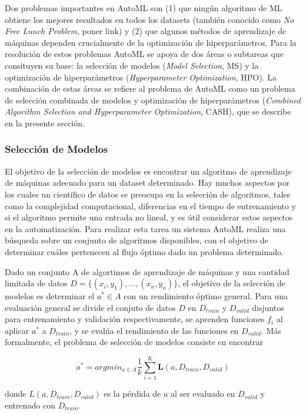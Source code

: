 Dos problemas importantes en AutoML son (1) que ningún algoritmo de ML obtiene los mejores resultados en todos los datasets (también conocido como \textit{No Free Lunch Problem}, poner link) y (2) que algunos métodos de aprendizaje de máquinas dependen crucialmente de la optimización de hiperparámetros. Para la resolución de estos problemas AutoML se apoya de dos áreas o subtareas que consituyen su base: la selección de modelos (\textit{Model Selection}, MS) y la optimización de hiperparámetros (\textit{Hyperparameter Optimization}, HPO). La combinación de estas áreas se refiere al problema de AutoML como un problema de selección combinada de modelos y optimización de hiperparámetros (\textit{Combined Algorithm Selection and Hyperparameter Optimization}, CASH), que se describe en la presente sección.

\subsubsection{Selección de Modelos}

El objetivo de la selección de modelos es encontrar un algoritmo de aprendizaje de máquinas adecuado para un dataset determinado. Hay muchos aspectos por los cuales un científico de datos se preocupa en la selección de algoritmos, tales como la complejidad computacional, diferencias en el tiempo de entrenamiento y si el algoritmo permite una entrada no lineal, y es útil considerar estos aspectos en la automatización. Para realizar esta tarea un sistema AutoML realiza una búsqueda sobre un conjunto de algoritmos disponibles, con el objetivo de determinar cuáles pertenecen al flujo óptimo dado un problema determinado.

\begin{definition}
	Dado un conjunto A de algortimos de aprendizaje de máquinas y una cantidad limitada de datos $D = \{(x_i, y_1),..., (x_n, y_n)\}$, el objetivo de la selección de modelos es determinar el $a^* \in A$ con un rendimiento óptimo general. Para una evaluación general se divide el conjuto de datos $D$ en $D_{train}$ y $D_{valid}$ disjuntos para entrenamiento y validación respectivamente, se aprenden funciones $f_i$ al aplicar $a^*$ a $D_{train}$, y se evalúa el rendimiento de las funciones en $D_{valid}$. Más formalmente, el problema de selección de modelos consiste en encontrar

	\begin{equation}
		a^* = argmin_{a \in A}\dfrac{1}{k}\sum_{i=1}^K \textbf{L}(a, D_{train}, D_{valid})
	\end{equation}
	
	donde $L(a, D_{train}, D_{valid})$ es la pérdida de $a$ al ser evaluado en $D_{valid}$ y entrenado con $D_{train}$.
	

\end{definition}

